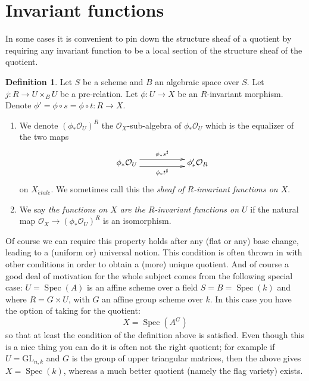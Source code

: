 \documentclass{stacks-project}
\theoremstyle{plain}
\theoremstyle{definition}
\newtheorem{definition}[subsection]{Definition}
\theoremstyle{remark}
\numberwithin{equation}{subsection}
\def\Spec{\mathop{\mathrm{Spec}}}
\def\etale{{\acute{e}tale}}
\begin{document}
\section{Invariant functions}
\label{section-functions}

\noindent
In some cases it is convenient to pin down the structure sheaf
of a quotient by requiring any invariant function to be a local
section of the structure sheaf of the quotient.

\begin{definition}
\label{definition-functions}
Let $S$ be a scheme and $B$ an algebraic space over $S$.
Let $j : R \to U \times_B U$ be a pre-relation.
Let $\phi : U \to X$ be an $R$-invariant morphism.
Denote $\phi' = \phi \circ s = \phi \circ t : R \to X$.
\begin{enumerate}
\item We denote $(\phi_*\mathcal{O}_U)^R$ the $\mathcal{O}_X$-sub-algebra
of $\phi_*\mathcal{O}_U$ which is the equalizer of the two maps
$$
\xymatrix{
\phi_*\mathcal{O}_U
\ar@<1ex>[rr]^{\phi_*s^\sharp}
\ar@<-1ex>[rr]_{\phi_*t^\sharp}
& &
\phi'_*\mathcal{O}_R
}
$$
on $X_\etale$. We sometimes call this the
{\it sheaf of $R$-invariant functions on $X$}.
\item We say {\it the functions on $X$ are the $R$-invariant functions on
$U$} if the natural map $\mathcal{O}_X \to (\phi_*\mathcal{O}_U)^R$
is an isomorphism.
\end{enumerate}
\end{definition}

\noindent
Of course we can require this property holds after any
(flat or any) base change, leading to a (uniform or) universal notion.
This condition is often thrown in
with other conditions in order to obtain a (more) unique quotient. And of
course a good deal of motivation for the whole subject comes from the following
special case: $U = \Spec(A)$ is an affine scheme over a field
$S = B = \Spec(k)$ and where $R = G \times U$, with
$G$ an affine group scheme over $k$. In this case
you have the option of taking for the quotient:
$$
X = \Spec(A^G)
$$
so that at least the condition of the definition above is satisfied.
Even though this is a nice thing you can do it is often not the right
quotient; for example if $U = \text{GL}_{n, k}$ and $G$ is the group of
upper triangular matrices, then the above gives $X = \Spec(k)$, whereas
a much better quotient (namely the flag variety) exists.
\end{document}
